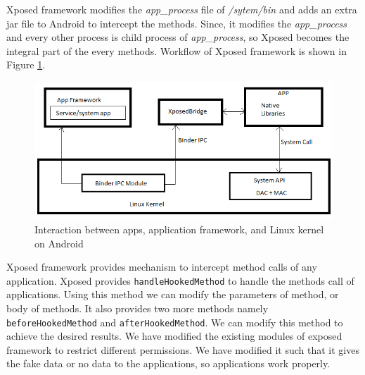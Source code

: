 Xposed framework modifies the \textit{app\_process} file of \textit{/sytem/bin} and adds an extra jar file to Android to intercept the methods. Since, it modifies the \textit{app\_process} and every other process is child process of \textit{app\_process}, so Xposed becomes the integral part of the every methods. Workflow of Xposed framework is shown in Figure \ref{fig:impl2}.
\begin{figure}[!h]
  \centering
  \includegraphics [scale=0.8] {impl2.png}
  \caption{Interaction between apps, application framework, and Linux kernel on Android}
  \label{fig:impl2}
\end{figure}

Xposed framework provides mechanism to intercept method calls of any application. Xposed provides \texttt{handleHookedMethod} to handle the methods call of applications. Using this method we can modify the parameters of method, or body of methods. It also provides two more methods namely \texttt{beforeHookedMethod} and \texttt{afterHookedMethod}. We can modify this method to achieve the desired results. We have modified the existing modules of exposed framework to restrict different permissions. We have modified it such that it gives the fake data or no data to the applications, so applications work properly.
